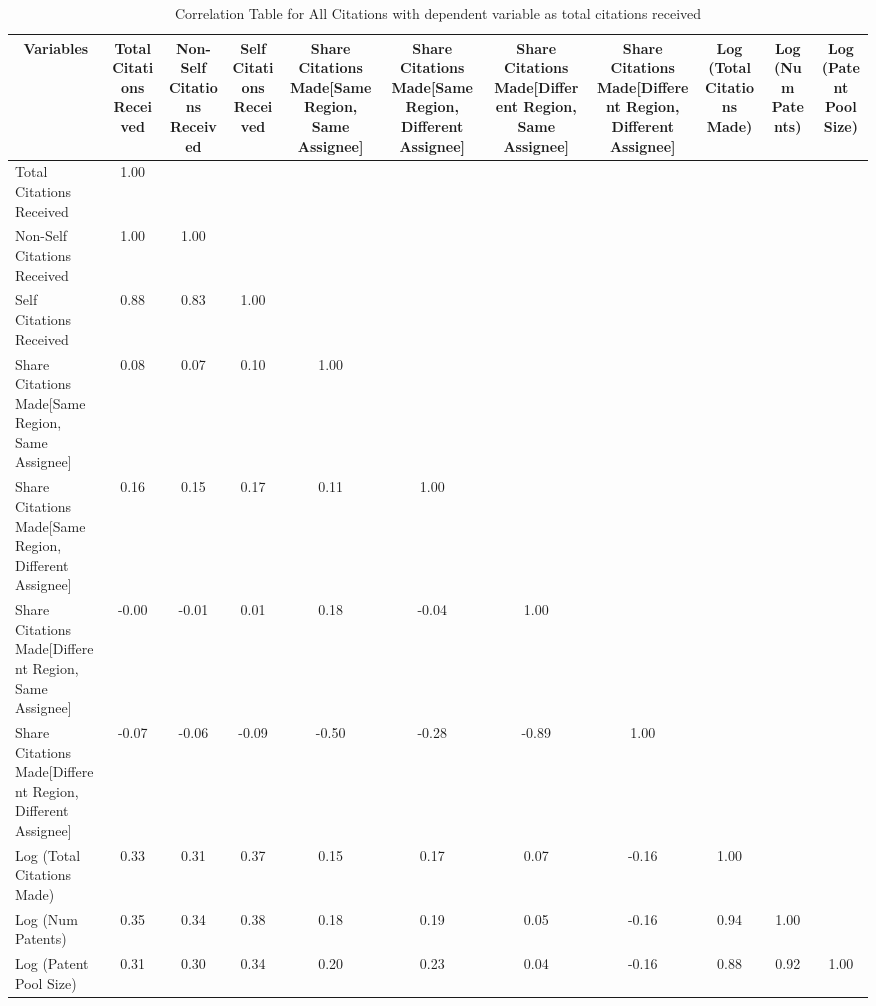 \begin{table}[htbp]\centering \caption{Correlation Table for All Citations with dependent variable as total citations received\label{a.e.o.t.n.tcorrelation}}
\begin{tabular}{l  c  c  c  c  c  c  c  c  c  c }\hline\hline
\multicolumn{1}{c}{Variables} &Total Citations Received&Non-Self Citations Received&Self Citations Received&Share Citations Made[Same Region, Same Assignee]&Share Citations Made[Same Region, Different Assignee]&Share Citations Made[Different Region, Same Assignee]&Share Citations Made[Different Region, Different Assignee]&Log (Total Citations Made)&Log (Num Patents)&Log (Patent Pool Size)\\ \hline
Total Citations Received&1.00\\
Non-Self Citations Received&1.00&1.00\\
Self Citations Received&0.88&0.83&1.00\\
Share Citations Made[Same Region, Same Assignee]&0.08&0.07&0.10&1.00\\
Share Citations Made[Same Region, Different Assignee]&0.16&0.15&0.17&0.11&1.00\\
Share Citations Made[Different Region, Same Assignee]&-0.00&-0.01&0.01&0.18&-0.04&1.00\\
Share Citations Made[Different Region, Different Assignee]&-0.07&-0.06&-0.09&-0.50&-0.28&-0.89&1.00\\
Log (Total Citations Made)&0.33&0.31&0.37&0.15&0.17&0.07&-0.16&1.00\\
Log (Num Patents)&0.35&0.34&0.38&0.18&0.19&0.05&-0.16&0.94&1.00\\
Log (Patent Pool Size)&0.31&0.30&0.34&0.20&0.23&0.04&-0.16&0.88&0.92&1.00\\
\hline \hline 
 \end{tabular}
\end{table}
